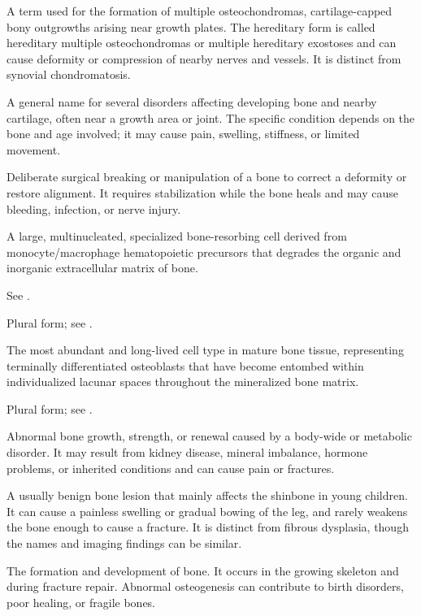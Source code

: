  A term used for the formation of multiple
osteochondromas, cartilage-capped bony outgrowths arising near growth plates. The
hereditary form is called hereditary multiple osteochondromas or multiple hereditary
exostoses and can cause deformity or compression of nearby nerves and vessels. It is
distinct from synovial chondromatosis.

 A general name for several disorders affecting developing bone and nearby cartilage, often near a growth area or joint. The specific condition depends on the bone and age involved; it may cause pain, swelling, stiffness, or limited movement.

 Deliberate surgical breaking or manipulation of a bone to correct a deformity or restore alignment. It requires stabilization while the bone heals and may cause bleeding, infection, or nerve injury.

 A large, multinucleated, specialized bone-resorbing cell derived from monocyte/macrophage hematopoietic precursors that degrades the organic and inorganic extracellular matrix of bone.

 See .

 Plural form; see .

 The most abundant and long-lived cell type in mature bone tissue, representing terminally differentiated osteoblasts that have become entombed within individualized lacunar spaces throughout the mineralized bone matrix.

 Plural form; see .

 Abnormal bone growth, strength, or renewal caused by a body-wide or metabolic disorder. It may result from kidney disease, mineral imbalance, hormone problems, or inherited conditions and can cause pain or fractures.

 A usually benign bone lesion that
  mainly affects the shinbone in young children. It can cause a painless
  swelling or gradual bowing of the leg, and rarely weakens the bone
  enough to cause a fracture. It is distinct from fibrous dysplasia,
  though the names and imaging findings can be similar.

 The formation and development of bone. It occurs in the growing skeleton and during fracture repair. Abnormal osteogenesis can contribute to birth disorders, poor healing, or fragile bones.

